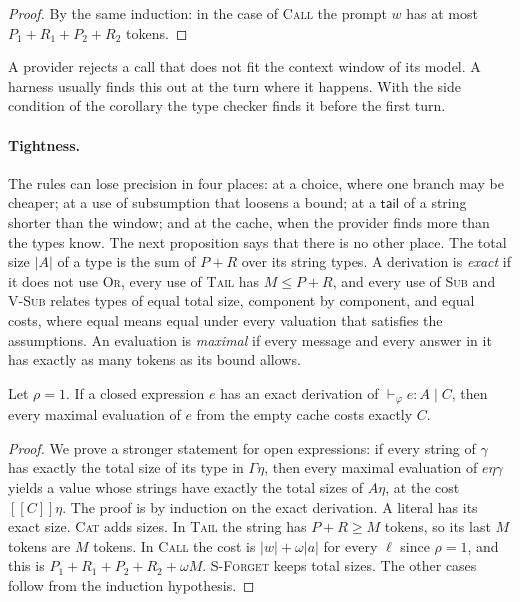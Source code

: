 \documentclass[acmsmall,nonacm,screen]{acmart}
\newcommand{\kw}[1]{\mathsf{#1}}
\newcommand{\sem}[1]{[\![#1]\!]}
\begin{document}
\begin{proof}
By the same induction: in the case of \textsc{Call} the prompt $w$ has at most
$P_1 + R_1 + P_2 + R_2$ tokens.
\end{proof}

A provider rejects a call that does not fit the context window of its model. A harness
usually finds this out at the turn where it happens. With the side condition of the corollary
the type checker finds it before the first turn.

\paragraph{Tightness.} The rules can lose precision in four places: at a choice, where one
branch may be cheaper; at a use of subsumption that loosens a bound; at a $\kw{tail}$ of a
string shorter than the window; and at the cache, when the provider finds more than the types
know. The next proposition says that there is no other place. The total size $|A|$ of a type
is the sum of $P + R$ over its string types. A derivation is \emph{exact} if it does not use
\textsc{Or}, every use of \textsc{Tail} has $M \le P + R$, and every use of \textsc{Sub} and
\textsc{V-Sub} relates types of equal total size, component by component, and equal costs,
where equal means equal under every valuation that satisfies the assumptions. An
evaluation is \emph{maximal} if every message and every answer in it has exactly as many
tokens as its bound allows.

\begin{proposition}
\label{prop:attained}
Let $\rho = 1$. If a closed expression $e$ has an exact derivation of
$\vdash_\varphi e : A \mid C$, then every maximal evaluation of $e$ from the empty cache costs
exactly $C$.
\end{proposition}

\begin{proof}
We prove a stronger statement for open expressions: if every string of $\gamma$ has exactly
the total size of its type in $\Gamma\eta$, then every maximal evaluation of $e\eta\gamma$
yields a value whose strings have exactly the total sizes of $A\eta$, at the cost
$\sem{C}\eta$. The proof is by induction on the exact derivation. A literal has its exact
size. \textsc{Cat} adds sizes. In \textsc{Tail} the string has $P + R \ge M$ tokens, so its
last $M$ tokens are $M$ tokens. In \textsc{Call} the cost is $|w| + \omega|a|$ for every
$\ell$ since $\rho = 1$, and this is $P_1 + R_1 + P_2 + R_2 + \omega M$. \textsc{S-Forget}
keeps total sizes. The other cases follow from the induction hypothesis.
\end{proof}
\end{document}
